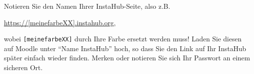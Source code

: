 \begin{myexercise}
  Notieren Sie den Namen Ihrer InstaHub-Seite, also z.B. 
  \begin{center}
    \url{https://[meinefarbeXX].instahub.org},
  \end{center}
  wobei \texttt{[meinefarbeXX]} durch Ihre Farbe ersetzt werden muss! 
  Laden Sie diesen auf Moodle unter \enquote{Name InstaHub} hoch, so dass Sie den Link auf Ihr InstaHub später einfach wieder finden. Merken oder notieren Sie sich Ihr Passwort an einem sicheren Ort.
\end{myexercise}










